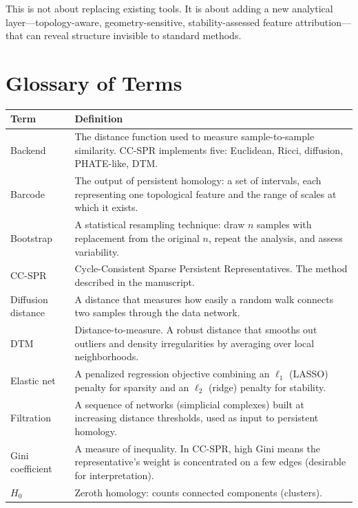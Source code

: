 \documentclass[11pt]{article}
\begin{document}
This is not about replacing existing tools.
It is about adding a new analytical layer---topology-aware, geometry-sensitive, stability-assessed feature attribution---that can reveal structure invisible to standard methods.

\appendix
\section{Glossary of Terms}
\label{sec:glossary}

\begin{longtable}{p{3.5cm}p{9cm}}
\toprule
\textbf{Term} & \textbf{Definition} \\
\midrule
\endhead
Backend & The distance function used to measure sample-to-sample similarity. CC-SPR implements five: Euclidean, Ricci, diffusion, PHATE-like, DTM. \\
\midrule
Barcode & The output of persistent homology: a set of intervals, each representing one topological feature and the range of scales at which it exists. \\
\midrule
Bootstrap & A statistical resampling technique: draw $n$ samples with replacement from the original $n$, repeat the analysis, and assess variability. \\
\midrule
CC-SPR & Cycle-Consistent Sparse Persistent Representatives. The method described in the manuscript. \\
\midrule
Diffusion distance & A distance that measures how easily a random walk connects two samples through the data network. \\
\midrule
DTM & Distance-to-measure. A robust distance that smooths out outliers and density irregularities by averaging over local neighborhoods. \\
\midrule
Elastic net & A penalized regression objective combining an $\ell_1$ (LASSO) penalty for sparsity and an $\ell_2$ (ridge) penalty for stability. \\
\midrule
Filtration & A sequence of networks (simplicial complexes) built at increasing distance thresholds, used as input to persistent homology. \\
\midrule
Gini coefficient & A measure of inequality. In CC-SPR, high Gini means the representative's weight is concentrated on a few edges (desirable for interpretation). \\
\midrule
$H_0$ & Zeroth homology: counts connected components (clusters). \\

\end{longtable}
\end{document}
